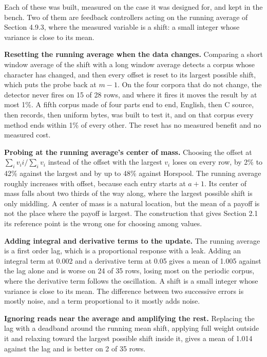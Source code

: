 Each of these was built, measured on the case it was designed for, and kept in the bench. Two of them are feedback controllers acting on the running average of Section 4.9.3, where the measured variable is a shift: a small integer whose variance is close to its mean.

\noindent\textbf{Resetting the running average when the data changes.} Comparing a short window average of the shift with a long window average detects a corpus whose character has changed, and then every offset is reset to its largest possible shift, which puts the probe back at \(m-1\). On the four corpora that do not change, the detector never fires on 15 of 28 rows, and where it fires it moves the result by at most 1\%. A fifth corpus made of four parts end to end, English, then C source, then records, then uniform bytes, was built to test it, and on that corpus every method ends within 1\% of every other. The reset has no measured benefit and no measured cost.

\noindent\textbf{Probing at the running average's center of mass.} Choosing the offset at \(\sum_i v_i i / \sum_i v_i\) instead of the offset with the largest \(v_i\) loses on every row, by 2\% to 42\% against the largest and by up to 48\% against Horspool. The running average roughly increases with offset, because each entry starts at \(a+1\). Its center of mass falls about two thirds of the way along, where the largest possible shift is only middling. A center of mass is a natural location, but the mean of a payoff is not the place where the payoff is largest. The construction that gives Section 2.1 its reference point is the wrong one for choosing among values.

\noindent\textbf{Adding integral and derivative terms to the update.} The running average is a first order lag, which is a proportional response with a leak. Adding an integral term at 0.002 and a derivative term at 0.05 gives a mean of 1.005 against the lag alone and is worse on 24 of 35 rows, losing most on the periodic corpus, where the derivative term follows the oscillation. A shift is a small integer whose variance is close to its mean. The difference between two successive errors is mostly noise, and a term proportional to it mostly adds noise.

\noindent\textbf{Ignoring reads near the average and amplifying the rest.} Replacing the lag with a deadband around the running mean shift, applying full weight outside it and relaxing toward the largest possible shift inside it, gives a mean of 1.014 against the lag and is better on 2 of 35 rows.

